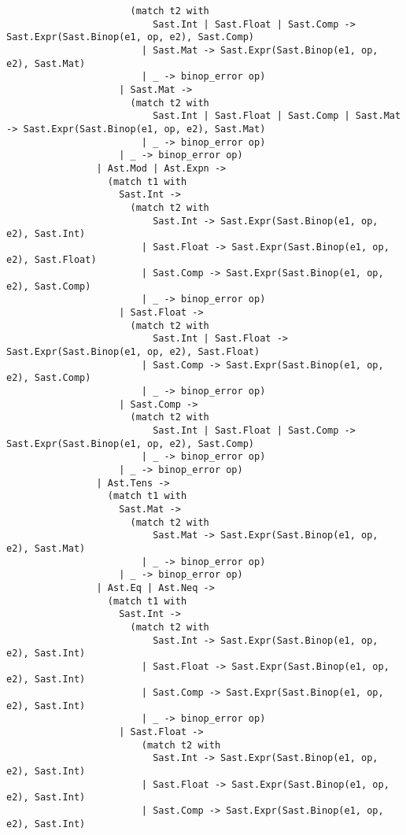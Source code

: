 \begin{lstlisting}
                      (match t2 with
                          Sast.Int | Sast.Float | Sast.Comp -> Sast.Expr(Sast.Binop(e1, op, e2), Sast.Comp)
                        | Sast.Mat -> Sast.Expr(Sast.Binop(e1, op, e2), Sast.Mat)
                        | _ -> binop_error op)
                    | Sast.Mat ->
                      (match t2 with
                          Sast.Int | Sast.Float | Sast.Comp | Sast.Mat -> Sast.Expr(Sast.Binop(e1, op, e2), Sast.Mat)
                        | _ -> binop_error op)
                    | _ -> binop_error op)
                | Ast.Mod | Ast.Expn ->
                  (match t1 with
                    Sast.Int -> 
                      (match t2 with
                          Sast.Int -> Sast.Expr(Sast.Binop(e1, op, e2), Sast.Int)
                        | Sast.Float -> Sast.Expr(Sast.Binop(e1, op, e2), Sast.Float)
                        | Sast.Comp -> Sast.Expr(Sast.Binop(e1, op, e2), Sast.Comp)
                        | _ -> binop_error op)
                    | Sast.Float -> 
                      (match t2 with
                          Sast.Int | Sast.Float -> Sast.Expr(Sast.Binop(e1, op, e2), Sast.Float)
                        | Sast.Comp -> Sast.Expr(Sast.Binop(e1, op, e2), Sast.Comp)
                        | _ -> binop_error op)
                    | Sast.Comp -> 
                      (match t2 with
                          Sast.Int | Sast.Float | Sast.Comp -> Sast.Expr(Sast.Binop(e1, op, e2), Sast.Comp)
                        | _ -> binop_error op)
                    | _ -> binop_error op)
                | Ast.Tens ->
                  (match t1 with
                    Sast.Mat ->
                      (match t2 with
                          Sast.Mat -> Sast.Expr(Sast.Binop(e1, op, e2), Sast.Mat)
                        | _ -> binop_error op)
                    | _ -> binop_error op)
                | Ast.Eq | Ast.Neq ->
                  (match t1 with
                    Sast.Int ->
                      (match t2 with
                          Sast.Int -> Sast.Expr(Sast.Binop(e1, op, e2), Sast.Int)
                        | Sast.Float -> Sast.Expr(Sast.Binop(e1, op, e2), Sast.Int)
                        | Sast.Comp -> Sast.Expr(Sast.Binop(e1, op, e2), Sast.Int)
                        | _ -> binop_error op)
                    | Sast.Float ->
                        (match t2 with
                          Sast.Int -> Sast.Expr(Sast.Binop(e1, op, e2), Sast.Int)
                        | Sast.Float -> Sast.Expr(Sast.Binop(e1, op, e2), Sast.Int)
                        | Sast.Comp -> Sast.Expr(Sast.Binop(e1, op, e2), Sast.Int)

\end{lstlisting}
